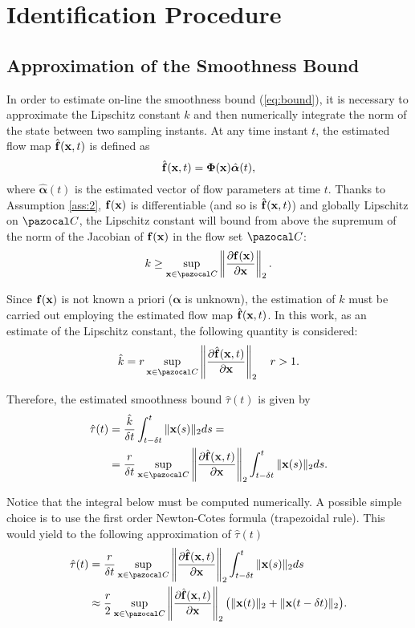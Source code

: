 \section{Identification Procedure}\label{Identification}

\subsection{Approximation of the Smoothness Bound}
In order to estimate on-line the smoothness bound (\ref{eq:bound}), it is necessary to approximate the Lipschitz constant $k$ and then numerically integrate the norm of the state between two sampling instants.
At any time instant $t$, the estimated flow map $\hat{\mathbf{f}}(\mathbf{x},t)$ is defined as
%
\begin{equation}
    \hat{\mathbf{f}}(\mathbf{x},t)=\bm{\Phi}(\mathbf{x})\hat{\bm{\alpha}}(t),
\end{equation}
%
where $\hat{\bm{\alpha}}(t)$ is the estimated vector of flow parameters at time $t$. Thanks to Assumption \ref{ass:2}, $\mathbf{f}(\mathbf{x})$ is differentiable (and so is $\hat{\mathbf{f}}(\mathbf{x},t)$) and globally Lipschitz on $\C$, the Lipschitz constant will bound from above the supremum of the norm of the Jacobian of $\mathbf{f}(\mathbf{x})$ in the flow set $\C$:
%
\begin{equation}
    k\geq\sup\limits_{\x\in\C}\left\|\frac{\partial \mathbf{f}(\x)}{\partial\x}\right\|_2.
\end{equation}
%

Since $\mathbf{f}(\mathbf{x})$ is not known a priori ($\bm{\alpha}$ is unknown), the estimation of $k$ must be carried out employing the estimated flow map $\hat{\mathbf{f}}(\mathbf{x},t)$. In this work, as an estimate of the Lipschitz constant, the following quantity is considered:
%
\begin{equation}
    \hat{k} = r\sup\limits_{\x\in\C}\left\|\frac{\partial \hat{\mathbf{f}}(\x,t)}{\partial\x}\right\|_2\quad r>1.
\end{equation}
%

Therefore, the estimated smoothness bound $\hat{\tau}(t)$ is given by
%
\begin{align}
    \hat{\tau}(t) &= \frac{\hat{k}}{\delta t}\int_{t-\delta t}^{t}\|\x(s)\|_2ds =\\
                  &= \frac{r}{\delta t}\sup\limits_{\x\in\C}\left\|\frac{\partial \hat{\mathbf{f}}(\x,t)}{\partial\x}\right\|_2\int_{t-\delta t}^{t}\|\x(s)\|_2ds.
\end{align}
%

Notice that the integral below must be computed numerically. A possible simple choice is to use the first order Newton-Cotes formula (trapezoidal rule). This would yield to the following approximation of $\hat{\tau}(t)$
%
\begin{align}
    \hat{\tau}(t) &=\frac{r}{\delta t}\sup\limits_{\x\in\C}\left\|\frac{\partial \hat{\mathbf{f}}(\x,t)}{\partial\x}\right\|_2\int_{t-\delta t}^{t}\|\x(s)\|_2ds\\
    \label{eq:htau}
                  &\approx\frac{r}{2}\sup\limits_{\x\in\C}\left\|\frac{\partial \hat{\mathbf{f}}(\x,t)}{\partial\x}\right\|_2\big(\|\x(t)\|_2+\|\x(t-\delta t)\|_2\big).
\end{align}
%

